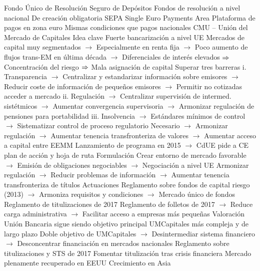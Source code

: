 \documentclass{nuevotema}
\begin{document}
\begin{esquemal}
				\4[] Fondo Único de Resolución
				\4 Seguro de Depósitos
				\4 Fondos de resolución a nivel nacional
				\4[] De creación obligatoria
			\3 SEPA
				\4 Single Euro Payments Area
				\4 Plataforma de pagos en zona euro
				\4[] Mismas condiciones que pagos nacionales
			\3 CMU -- Unión del Mercado de Capitales
				\4 Idea clave
				\4[] Fuerte bancarización a nivel UE
				\4[] Mercados de capital muy segmentados
				\4[] $\to$ Especialmente en renta fija
				\4[] $\to$ Poco aumento de flujos trans-EM en última década
				\4[] $\to$ Diferenciales de interés elevados
				\4[] $\Rightarrow$ Concentración del riesgo
				\4[] $\Rightarrow$ Mala asignación de capital
				\4 Superar tres barreras
				\4[] i. Transparencia
				\4[] $\to$ Centralizar y estandarizar información sobre emisores
				\4[] $\to$ Reducir coste de información de pequeños emisores
				\4[] $\to$ Permitir no cotizadas acceder a mercado
				\4[] ii. Regulación
				\4[] $\to$ Centralizar supervisión de intermed. sistétmicos
				\4[] $\to$ Aumentar convergencia supervisoria
				\4[] $\to$ Armonizar regulación de pensiones para portabilidad
				\4[] iii. Insolvencia
				\4[] $\to$ Estándares mínimos de control
				\4[] $\to$ Sistematizar control de proceso regulatorio
				\4[] Necesario
				\4[] $\to$ Armonizar regulación
				\4[] $\to$ Aumentar tenencia transfronteriza de valores
				\4[] $\to$ Aumentar acceso a capital entre EEMM
				\4[] Lanzamiento de programa en 2015
				\4[] $\to$ CdUE pide a CE plan de acción y hoja de ruta
				\4 Formulación
				\4[] Crear entorno de mercado favorable
				\4[] $\to$ Emisión de obligaciones negociables
				\4[] $\to$ Negociación a nivel UE
				\4[] Armonizar regulación
				\4[] $\to$ Reducir problemas de información
				\4[] $\to$ Aumentar tenencia transfronteriza de títulos
				\4 Actuaciones
				\4[] Reglamento sobre fondos de capital riesgo (2013)
				\4[] $\to$ Armoniza requisitos y condiciones
				\4[] $\to$ Mercado único de fondos
				\4[] Reglamento de titulizaciones de 2017
				\4[] Reglamento de folletos de 2017
				\4[] $\to$ Reduce carga administrativa
				\4[] $\to$ Facilitar acceso a empresas más pequeñas
				\4 Valoración
				\4[] Unión Bancaria sigue siendo objetivo principal
				\4[] UMCapitales más compleja y de largo plazo
				\4[] Doble objetivo de UMCapitales
				\4[] $\to$ Desintermediar sistema financiero
				\4[] $\to$ Desconcentrar financiación en mercados nacionales
			\3 Reglamento sobre titulizaciones y STS de 2017
				\4 Fomentar titulización tras crisis financiera
				\4[] Mercado plenamente recuperado en EEUU
				\4[] Crecimiento en Asia

\end{esquemal}
\end{document}
